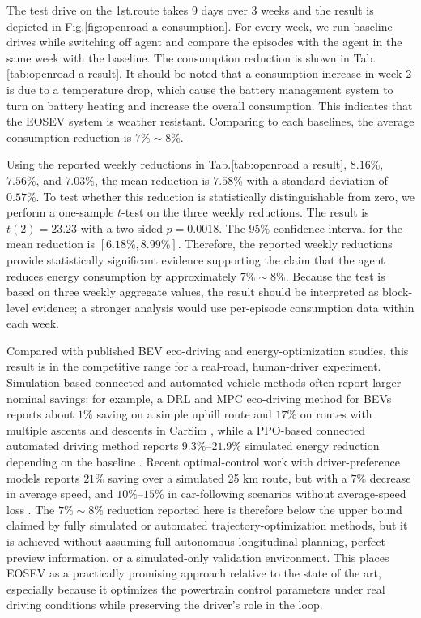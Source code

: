 \documentclass{article}
\begin{document}
The test drive on the 1st.\@ route takes 9 days over 3 weeks and the result is depicted in Fig.\@\ref{fig:openroad a consumption}. For every week, we run baseline drives while switching off agent and compare the episodes with the agent in the same week with the baseline. The consumption reduction is shown in Tab.\@\ref{tab:openroad a result}. It should be noted that a consumption increase in week 2 is due to a temperature drop, which cause the battery management system to turn on battery heating and increase the overall consumption. This indicates that the EOSEV system is weather resistant. Comparing to each baselines, the average consumption reduction is $7\%\sim8\%$.

Using the reported weekly reductions in Tab.\@\ref{tab:openroad a result}, $8.16\%$, $7.56\%$, and $7.03\%$, the mean reduction is $7.58\%$ with a standard deviation of $0.57\%$. To test whether this reduction is statistically distinguishable from zero, we perform a one-sample $t$-test on the three weekly reductions. The result is $t(2)=23.23$ with a two-sided $p=0.0018$. The 95\% confidence interval for the mean reduction is $[6.18\%, 8.99\%]$. Therefore, the reported weekly reductions provide statistically significant evidence supporting the claim that the agent reduces energy consumption by approximately $7\%\sim8\%$. Because the test is based on three weekly aggregate values, the result should be interpreted as block-level evidence; a stronger analysis would use per-episode consumption data within each week.

Compared with published BEV eco-driving and energy-optimization studies, this result is in the competitive range for a real-road, human-driver experiment. Simulation-based connected and automated vehicle methods often report larger nominal savings: for example, a DRL and MPC eco-driving method for BEVs reports about $1\%$ saving on a simple uphill route and $17\%$ on routes with multiple ascents and descents in CarSim \parencite{Yeom_2022}, while a PPO-based connected automated driving method reports $9.3\%$--$21.9\%$ simulated energy reduction depending on the baseline \parencite{Min_2023}. Recent optimal-control work with driver-preference models reports $21\%$ saving over a simulated 25 km route, but with a $7\%$ decrease in average speed, and $10\%$--$15\%$ in car-following scenarios without average-speed loss \parencite{Lot_2025}. The $7\%\sim8\%$ reduction reported here is therefore below the upper bound claimed by fully simulated or automated trajectory-optimization methods, but it is achieved without assuming full autonomous longitudinal planning, perfect preview information, or a simulated-only validation environment. This places EOSEV as a practically promising approach relative to the state of the art, especially because it optimizes the powertrain control parameters under real driving conditions while preserving the driver's role in the loop.
\end{document}
